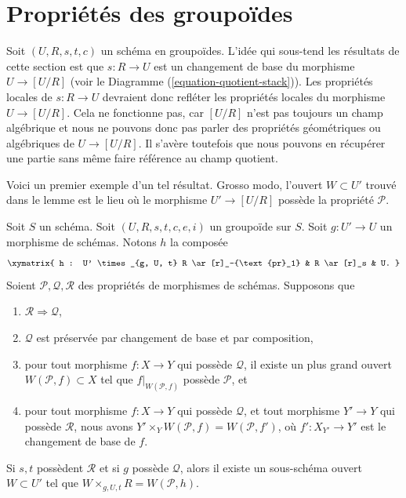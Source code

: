 \section{Propriétés des groupoïdes}
\label{section-technical-lemma}

\noindent
Soit $(U, R, s, t, c)$ un schéma en groupoïdes.
L'idée qui sous-tend les résultats de cette section est que $s: R \to U$
est un changement de base du morphisme $U \to [U/R]$ (voir
le Diagramme (\ref{equation-quotient-stack})).
Les propriétés locales de $s : R \to U$ devraient donc refléter les
propriétés locales du morphisme $U \to [U/R]$.
Cela ne fonctionne pas, car $[U/R]$ n'est pas toujours un champ algébrique et
nous ne pouvons donc pas parler des propriétés géométriques ou algébriques de
$U \to [U/R]$.
Il s'avère toutefois que nous pouvons en récupérer une partie sans même
faire référence au champ quotient.

\medskip\noindent
Voici un premier exemple d'un tel résultat. Grosso modo, l'ouvert $W \subset U'$
trouvé dans le lemme est le lieu où le morphisme
$U' \to [U/R]$ possède la propriété $\mathcal{P}$.

\begin{lemma}
\label{lemma-local-source}
Soit $S$ un schéma.
Soit $(U, R, s, t, c, e, i)$ un groupoïde sur $S$.
Soit $g : U' \to U$ un morphisme de schémas.
Notons $h$ la composée
$$
\xymatrix{
h : U' \times_{g, U, t} R \ar[r]_-{\text{pr}_1} & R \ar[r]_s & U.
}
$$
Soient $\mathcal{P}, \mathcal{Q}, \mathcal{R}$ des propriétés de morphismes
de schémas. Supposons que
\begin{enumerate}
\item $\mathcal{R} \Rightarrow \mathcal{Q}$,
\item $\mathcal{Q}$ est préservée par changement de base et par composition,
\item pour tout morphisme $f : X \to Y$ qui possède $\mathcal{Q}$, il existe un
plus grand ouvert $W(\mathcal{P}, f) \subset X$ tel que $f|_{W(\mathcal{P}, f)}$
possède $\mathcal{P}$, et
\item pour tout morphisme $f : X \to Y$ qui possède $\mathcal{Q}$,
et tout morphisme $Y' \to Y$ qui possède $\mathcal{R}$, nous avons
$Y' \times_Y W(\mathcal{P}, f) = W(\mathcal{P}, f')$, où
$f' : X_{Y'} \to Y'$ est le changement de base de $f$.
\end{enumerate}
Si $s, t$ possèdent $\mathcal{R}$ et si $g$ possède $\mathcal{Q}$, alors
il existe un sous-schéma ouvert $W \subset U'$ tel que
$W \times_{g, U, t} R = W(\mathcal{P}, h)$.
\end{lemma}

